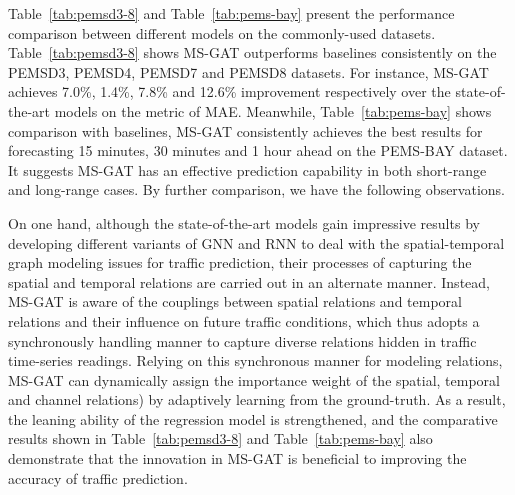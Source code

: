 Table~\ref{tab:pemsd3-8} and Table~\ref{tab:pems-bay} present the performance comparison between different models on the commonly-used datasets. Table~\ref{tab:pemsd3-8} shows MS-GAT outperforms baselines consistently on the PEMSD3, PEMSD4, PEMSD7 and PEMSD8 datasets. For instance, MS-GAT achieves 7.0\%, 1.4\%, 7.8\% and 12.6\% improvement respectively over the state-of-the-art models on the metric of MAE. Meanwhile, Table~\ref{tab:pems-bay} shows comparison with baselines, MS-GAT consistently achieves the  best results for forecasting 15 minutes, 30 minutes and 1 hour ahead on the PEMS-BAY dataset. It suggests MS-GAT has an effective prediction capability in both short-range and long-range cases. By further comparison, we have the following observations.

On one hand, although the state-of-the-art models gain impressive results by developing different variants of GNN and RNN to deal with the spatial-temporal graph modeling issues for traffic prediction,  their processes of  capturing the spatial and temporal relations are carried out in an alternate manner. Instead, MS-GAT is aware of the couplings between spatial relations and temporal relations and their influence on future traffic conditions, which thus adopts a synchronously handling manner to capture diverse relations hidden in traffic time-series readings. Relying on this synchronous manner for modeling relations, MS-GAT can dynamically assign the importance weight of the spatial, temporal  and channel relations) by adaptively learning from the ground-truth. As a result, the leaning ability of the regression model is strengthened, and the comparative results shown in Table~\ref{tab:pemsd3-8} and Table~\ref{tab:pems-bay} also demonstrate that the innovation in MS-GAT is beneficial to improving the accuracy of traffic prediction.


